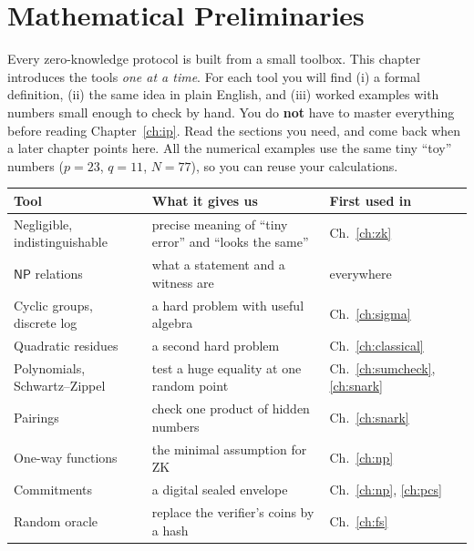 \documentclass[11pt,a4paper]{report}
\theoremstyle{plain}
\theoremstyle{definition}
\theoremstyle{remark}
\newcommand{\NP}{\mathsf{NP}}\newcommand{\BPP}{\mathsf{BPP}}\newcommand{\IP}{\mathsf{IP}}
\begin{document}
\newcommand{\PE}{\textbf{In plain English.}\ }

\chapter{Mathematical Preliminaries}\label{ch:prelim}

\begin{intuition}
Every zero-knowledge protocol is built from a small toolbox. This chapter introduces the tools \emph{one at a time}. For each tool you will find (i) a formal definition, (ii) the same idea in plain English, and (iii) worked examples with numbers small enough to check by hand.
You do \textbf{not} have to master everything before reading Chapter~\ref{ch:ip}. Read the sections you need, and come back when a later chapter points here. All the numerical examples use the same tiny ``toy'' numbers ($p=23$, $q=11$, $N=77$), so you can reuse your calculations.
\end{intuition}

\begin{center}
\renewcommand{\arraystretch}{1.25}
\begin{tabular}{@{}L{4.3cm} L{5.9cm} L{3.6cm}@{}}
\toprule
\textbf{Tool} & \textbf{What it gives us} & \textbf{First used in}\\
\midrule
Negligible, indistinguishable & precise meaning of ``tiny error'' and ``looks the same'' & Ch.~\ref{ch:zk}\\
$\NP$ relations & what a statement and a witness are & everywhere\\
Cyclic groups, discrete log & a hard problem with useful algebra & Ch.~\ref{ch:sigma}\\
Quadratic residues & a second hard problem & Ch.~\ref{ch:classical}\\
Polynomials, Schwartz--Zippel & test a huge equality at one random point & Ch.~\ref{ch:sumcheck}, \ref{ch:snark}\\
Pairings & check one product of hidden numbers & Ch.~\ref{ch:snark}\\
One-way functions & the minimal assumption for ZK & Ch.~\ref{ch:np}\\
Commitments & a digital sealed envelope & Ch.~\ref{ch:np}, \ref{ch:pcs}\\
Random oracle & replace the verifier's coins by a hash & Ch.~\ref{ch:fs}\\
\bottomrule
\end{tabular}
\end{center}
\end{document}
